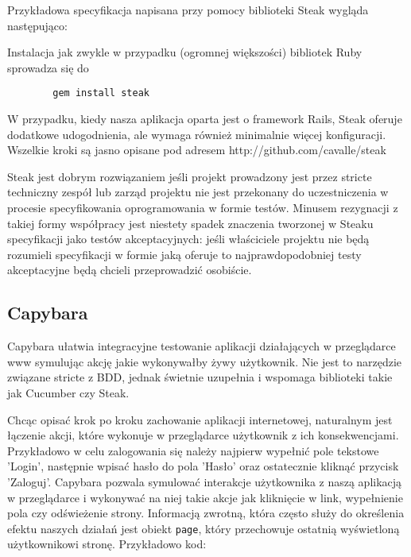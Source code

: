       Przykładowa specyfikacja napisana przy pomocy biblioteki Steak wygląda następująco:
      
      
      
      Instalacja jak zwykle w przypadku (ogromnej większości) bibliotek Ruby sprowadza się do
      
      \begin{verbatim}
        gem install steak
      \end{verbatim}
      
      W przypadku, kiedy nasza aplikacja oparta jest o framework Rails, Steak oferuje dodatkowe udogodnienia, ale wymaga również minimalnie więcej konfiguracji. Wszelkie kroki są jasno opisane pod adresem http://github.com/cavalle/steak
      
      Steak jest dobrym rozwiązaniem jeśli projekt prowadzony jest przez stricte techniczny zespół lub zarząd projektu nie jest przekonany do uczestniczenia w procesie specyfikowania oprogramowania w formie testów. Minusem rezygnacji z takiej formy współpracy jest niestety spadek znaczenia tworzonej w Steaku specyfikacji jako testów akceptacyjnych: jeśli właściciele projektu nie będą rozumieli specyfikacji w formie jaką oferuje to najprawdopodobniej testy akceptacyjne będą chcieli przeprowadzić osobiście.
    
    \subsection{Capybara}  

      Capybara ułatwia integracyjne testowanie aplikacji działających w przeglądarce www symulując akcję jakie wykonywałby żywy użytkownik. Nie jest to narzędzie związane stricte z BDD, jednak świetnie uzupełnia i wspomaga biblioteki takie jak Cucumber czy Steak.
      
      Chcąc opisać krok po kroku zachowanie aplikacji internetowej, naturalnym jest łączenie akcji, które wykonuje w przeglądarce użytkownik z ich konsekwencjami. Przykładowo w celu zalogowania się należy najpierw wypełnić pole tekstowe 'Login', następnie wpisać hasło do pola 'Hasło' oraz ostatecznie kliknąć przycisk 'Zaloguj'. Capybara pozwala symulować interakcje użytkownika z naszą aplikacją w przeglądarce i wykonywać na niej takie akcje jak kliknięcie w link, wypełnienie pola czy odświeżenie strony.
      Informacją zwrotną, która często służy do określenia efektu naszych działań jest obiekt \verb+page+, który przechowuje ostatnią wyświetloną użytkownikowi stronę. Przykładowo kod:
      
